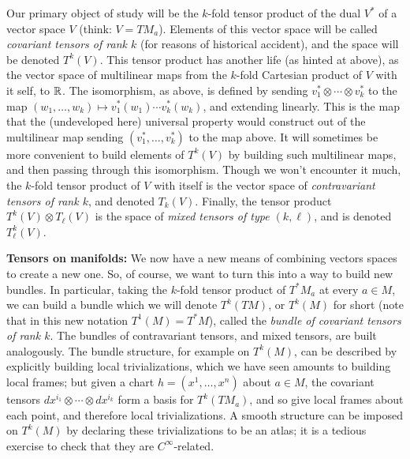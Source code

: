 Our primary object of study will be the $k$-fold tensor product of the dual $V^*$
of a vector space $V$ (think: $V=TM_a$). Elements of this vector space will be called 
{\it covariant tensors of rank $k$} (for reasons of historical accident),
and the space will be denoted $T^k(V)$. This tensor product has another life (as
hinted at above), as the vector space of multilinear maps from the
$k$-fold Cartesian product of $V$ with it self, to ${\Bbb R}$. The isomorphism,
as above, is defined by sending $v_1^*\otimes\cdots\otimes v_k^*$ to
the map $(w_1,\ldots ,w_k)\mapsto v_1^*(w_1)\cdots v_k^*(w_k)$, and extending
linearly. This is the map that the (undeveloped here) universal property would construct
out of the multilinear map sending $(v_1^*,\ldots ,v_k^*)$ to the map above.
It will sometimes be more convenient to build elements of $T^k(V)$
by building such multilinear maps, and then passing through this isomorphism.
Though we won't encounter it much, the $k$-fold tensor product of $V$ with itself
is the vector space of {\it contravariant tensors of rank $k$}, and denoted
$T_k(V)$. Finally, the tensor product $T^k(V)\otimes T_\ell(V)$
is the space of {\it mixed tensors of type $(k,\ell)$}, and is denoted $T^k_\ell(V)$.

\msk

{\bf Tensors on manifolds:} We now have a new means of combining vectors spaces
to create a new one. So, of course, we want to turn this into a way to build new
bundles. In particular, taking the $k$-fold tensor product of $T^*M_a$ at every
$a\in M$, we can build a bundle which we will denote $T^k(TM)$, or
$T^k(M)$ for short (note that in this new notation $T^1(M)=T^*M$),
called the {\it bundle of covariant tensors of rank $k$}. 
The bundles of contravariant tensors, and mixed tensors, are built 
analogously. The bundle structure, for example on $T^k(M)$, can be described 
by explicitly
building local trivializations, which we have seen amounts to building
local frames; but given a chart $h=(x^1,\ldots ,x^n)$ about $a\in M$,
the covariant tensors $dx^{i_1}\otimes \cdots \otimes dx^{i_k}$ form a
basis for $T^k(TM_a)$, and so give local frames about each point, and
therefore local trivializations. A smooth structure can be imposed on
$T^k(M)$ by declaring these trivializations to be an atlas;
it is a tedious exercise to check that they are $C^\infty$-related.

